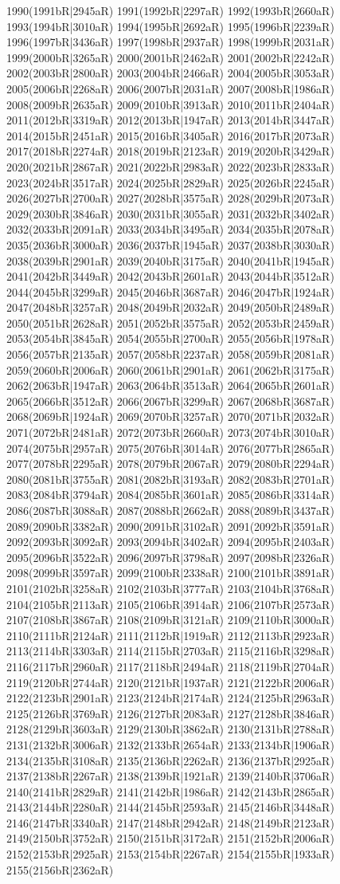 1990(1991bR|2945aR) 1991(1992bR|2297aR) 1992(1993bR|2660aR) 1993(1994bR|3010aR) 1994(1995bR|2692aR) 1995(1996bR|2239aR) 1996(1997bR|3436aR) 1997(1998bR|2937aR) 1998(1999bR|2031aR) 1999(2000bR|3265aR) 2000(2001bR|2462aR) 2001(2002bR|2242aR) 2002(2003bR|2800aR) 2003(2004bR|2466aR) 2004(2005bR|3053aR) 2005(2006bR|2268aR) 2006(2007bR|2031aR) 2007(2008bR|1986aR) 2008(2009bR|2635aR) 2009(2010bR|3913aR) 2010(2011bR|2404aR) 2011(2012bR|3319aR) 2012(2013bR|1947aR) 2013(2014bR|3447aR) 2014(2015bR|2451aR) 2015(2016bR|3405aR) 2016(2017bR|2073aR) 2017(2018bR|2274aR) 2018(2019bR|2123aR) 2019(2020bR|3429aR) 2020(2021bR|2867aR) 2021(2022bR|2983aR) 2022(2023bR|2833aR) 2023(2024bR|3517aR) 2024(2025bR|2829aR) 2025(2026bR|2245aR) 2026(2027bR|2700aR) 2027(2028bR|3575aR) 2028(2029bR|2073aR) 2029(2030bR|3846aR) 2030(2031bR|3055aR) 2031(2032bR|3402aR) 2032(2033bR|2091aR) 2033(2034bR|3495aR) 2034(2035bR|2078aR) 2035(2036bR|3000aR) 2036(2037bR|1945aR) 2037(2038bR|3030aR) 2038(2039bR|2901aR) 2039(2040bR|3175aR) 2040(2041bR|1945aR) 2041(2042bR|3449aR) 2042(2043bR|2601aR) 2043(2044bR|3512aR) 2044(2045bR|3299aR) 2045(2046bR|3687aR) 2046(2047bR|1924aR) 2047(2048bR|3257aR) 2048(2049bR|2032aR) 2049(2050bR|2489aR) 2050(2051bR|2628aR) 2051(2052bR|3575aR) 2052(2053bR|2459aR) 2053(2054bR|3845aR) 2054(2055bR|2700aR) 2055(2056bR|1978aR) 2056(2057bR|2135aR) 2057(2058bR|2237aR) 2058(2059bR|2081aR) 2059(2060bR|2006aR) 2060(2061bR|2901aR) 2061(2062bR|3175aR) 2062(2063bR|1947aR) 2063(2064bR|3513aR) 2064(2065bR|2601aR) 2065(2066bR|3512aR) 2066(2067bR|3299aR) 2067(2068bR|3687aR) 2068(2069bR|1924aR) 2069(2070bR|3257aR) 2070(2071bR|2032aR) 2071(2072bR|2481aR) 2072(2073bR|2660aR) 2073(2074bR|3010aR) 2074(2075bR|2957aR) 2075(2076bR|3014aR) 2076(2077bR|2865aR) 2077(2078bR|2295aR) 2078(2079bR|2067aR) 2079(2080bR|2294aR) 2080(2081bR|3755aR) 2081(2082bR|3193aR) 2082(2083bR|2701aR) 2083(2084bR|3794aR) 2084(2085bR|3601aR) 2085(2086bR|3314aR) 2086(2087bR|3088aR) 2087(2088bR|2662aR) 2088(2089bR|3437aR) 2089(2090bR|3382aR) 2090(2091bR|3102aR) 2091(2092bR|3591aR) 2092(2093bR|3092aR) 2093(2094bR|3402aR) 2094(2095bR|2403aR) 2095(2096bR|3522aR) 2096(2097bR|3798aR) 2097(2098bR|2326aR) 2098(2099bR|3597aR) 2099(2100bR|2338aR) 2100(2101bR|3891aR) 2101(2102bR|3258aR) 2102(2103bR|3777aR) 2103(2104bR|3768aR) 2104(2105bR|2113aR) 2105(2106bR|3914aR) 2106(2107bR|2573aR) 2107(2108bR|3867aR) 2108(2109bR|3121aR) 2109(2110bR|3000aR) 2110(2111bR|2124aR) 2111(2112bR|1919aR) 2112(2113bR|2923aR) 2113(2114bR|3303aR) 2114(2115bR|2703aR) 2115(2116bR|3298aR) 2116(2117bR|2960aR) 2117(2118bR|2494aR) 2118(2119bR|2704aR) 2119(2120bR|2744aR) 2120(2121bR|1937aR) 2121(2122bR|2006aR) 2122(2123bR|2901aR) 2123(2124bR|2174aR) 2124(2125bR|2963aR) 2125(2126bR|3769aR) 2126(2127bR|2083aR) 2127(2128bR|3846aR) 2128(2129bR|3603aR) 2129(2130bR|3862aR) 2130(2131bR|2788aR) 2131(2132bR|3006aR) 2132(2133bR|2654aR) 2133(2134bR|1906aR) 2134(2135bR|3108aR) 2135(2136bR|2262aR) 2136(2137bR|2925aR) 2137(2138bR|2267aR) 2138(2139bR|1921aR) 2139(2140bR|3706aR) 2140(2141bR|2829aR) 2141(2142bR|1986aR) 2142(2143bR|2865aR) 2143(2144bR|2280aR) 2144(2145bR|2593aR) 2145(2146bR|3448aR) 2146(2147bR|3340aR) 2147(2148bR|2942aR) 2148(2149bR|2123aR) 2149(2150bR|3752aR) 2150(2151bR|3172aR) 2151(2152bR|2006aR) 2152(2153bR|2925aR) 2153(2154bR|2267aR) 2154(2155bR|1933aR) 2155(2156bR|2362aR) 